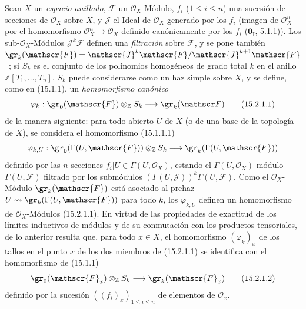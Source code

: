 \begin{env}[15.2.1]
\label{0.15.2.1-es}
Sean $X$ un \emph{espacio anillado}, $\mathscr{F}$ un $\mathcal{O}_X$-Módulo,
$f_i$ ($1\leq i\leq n$) una sucesión de secciones de $\mathcal{O}_X$ sobre
$X$, y $\mathscr{J}$ el Ideal de $\mathcal{O}_X$ generado por los $f_i$
(imagen de $\mathcal{O}_X^n$ por el homomorfismo
$\mathcal{O}_X^n\to\mathcal{O}_X$ definido canónicamente por los $f_i$
($\mathbf{0}_{\mathrm I}$, 5.1.1)). Los sub-$\mathcal{O}_X$-Módulos
$\mathscr{J}^k\mathscr{F}$ definen una \emph{filtración} sobre $\mathscr{F}$, y
se pone también
$\gr_k(\mathscr{F})=\mathscr{J}^k\mathscr{F}/\mathscr{J}^{k+1}\mathscr{F}$~;
si $S_k$ es el conjunto de los polinomios homogéneos de grado total $k$ en
el anillo $\mathbb{Z}[T_1,\ldots,T_n]$, $S_k$ puede considerarse como un
haz simple sobre $X$, y se define, como en (15.1.1), un \emph{homomorfismo
canónico}
\[
\label{0.15.2.1.1-es}
  \varphi_k:\gr_0(\mathscr{F})\otimes_{\mathbb Z}S_k
  \longrightarrow\gr_k(\mathscr F)
\tag{15.2.1.1}
\]
de la manera siguiente: para todo abierto $U$ de $X$ (o de una base de la
topología de $X$), se considera el homomorfismo (15.1.1.1)
\[
  \varphi_{k,U}:\gr_0(\Gamma(U,\mathscr{F}))\otimes_{\mathbb Z}S_k
  \longrightarrow\gr_k(\Gamma(U,\mathscr{F}))
\]
definido por las $n$ secciones $f_i|U\in\Gamma(U,\mathcal{O}_X)$, estando el
$\Gamma(U,\mathcal{O}_X)$-módulo $\Gamma(U,\mathscr{F})$ filtrado por los
submódulos $(\Gamma(U,\mathscr{J}))^k\Gamma(U,\mathscr{F})$. Como el
$\mathcal{O}_X$-Módulo $\gr_k(\mathscr{F})$ está asociado al prehaz
$U\leadsto\gr_k(\Gamma(U,\mathscr{F}))$ para todo $k$, los $\varphi_{k,U}$
definen un homomorfismo de $\mathcal{O}_X$-Módulos (15.2.1.1). En virtud
de las propiedades de exactitud de los límites inductivos de módulos y de su
conmutación con los productos tensoriales, de lo anterior resulta que, para
todo $x\in X$, el homomorfismo $(\varphi_k)_x$ de los tallos en el punto $x$
de los dos miembros de (15.2.1.1) se identifica con el homomorfismo de (15.1.1)
\[
\label{0.15.2.1.2-es}
  \gr_0(\mathscr{F}_x)\otimes_{\mathbb Z}S_k
  \longrightarrow\gr_k(\mathscr{F}_x)
\tag{15.2.1.2}
\]
definido por la sucesión $((f_i)_x)_{1\leq i\leq n}$ de elementos de
$\mathcal{O}_x$.
\end{env}

